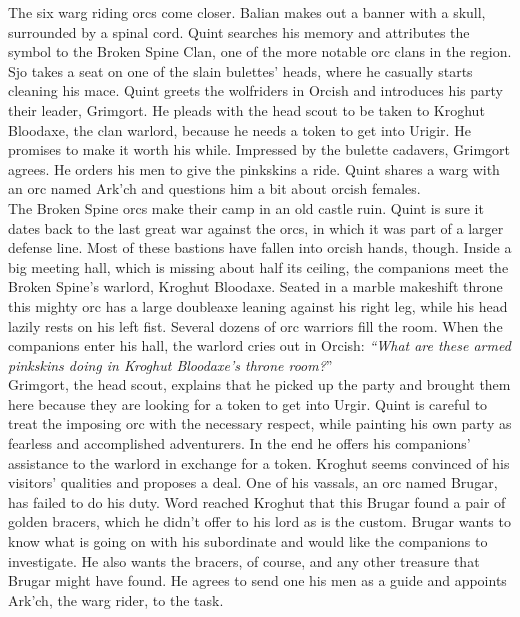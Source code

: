 The six warg riding orcs come closer. Balian makes out a banner with a skull, surrounded by a spinal cord. Quint searches his memory and attributes the symbol to the Broken Spine Clan, one of the more notable orc clans in the region. Sjo takes a seat on one of the slain bulettes' heads, where he casually starts cleaning his mace. Quint greets the wolfriders in Orcish and introduces his party their leader, Grimgort. He pleads with the head scout to be taken to Kroghut Bloodaxe, the clan warlord, because he needs a token to get into Urigir. He promises to make it worth his while. Impressed by the bulette cadavers, Grimgort agrees. He orders his men to give the pinkskins a ride. Quint shares a warg with an orc named Ark'ch and questions him a bit about orcish females.\\

The Broken Spine orcs make their camp in an old castle ruin. Quint is sure it dates back to the last great war against the orcs, in which it was part of a larger defense line. Most of these bastions have fallen into orcish hands, though. Inside a big meeting hall, which is missing about half its ceiling, the companions meet the Broken Spine's warlord, Kroghut Bloodaxe. Seated in a marble makeshift throne this mighty orc has a large doubleaxe leaning against his right leg, while his head lazily rests on his left fist. Several dozens of orc warriors fill the room. When the companions enter his hall, the warlord cries out in Orcish: {\itshape``What are these armed pinkskins doing in Kroghut Bloodaxe's throne room?}''\\

Grimgort, the head scout, explains that he picked up the party and brought them here because they are looking for a token to get into Urgir. Quint is careful to treat the imposing orc with the necessary respect, while painting his own party as fearless and accomplished adventurers. In the end he offers his companions' assistance to the warlord in exchange for a token. Kroghut seems convinced of his visitors' qualities and proposes a deal. One of his vassals, an orc named Brugar, has failed to do his duty. Word reached Kroghut that this Brugar found a pair of golden bracers, which he didn't offer to his lord as is the custom. Brugar wants to know what is going on with his subordinate and would like the companions to investigate. He also wants the bracers, of course, and any other treasure that Brugar might have found. He agrees to send one his men as a guide and appoints Ark'ch, the warg rider, to the task.\\

